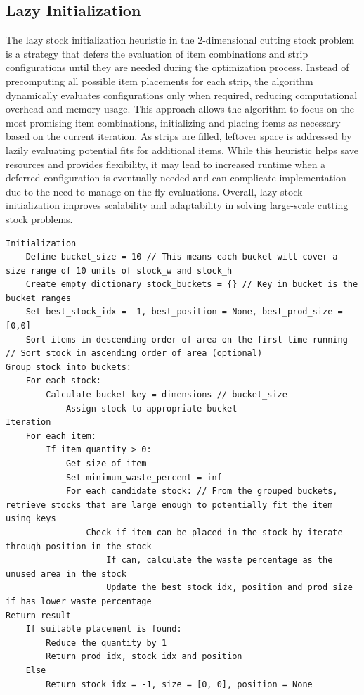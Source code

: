 \documentclass[a4paper]{article}
\begin{document}
\subsection{Lazy Initialization}
The lazy stock initialization heuristic in the 2-dimensional cutting stock problem is a strategy that defers the evaluation of item combinations and strip configurations until they are needed during the optimization process. Instead of precomputing all possible item placements for each strip, the algorithm dynamically evaluates configurations only when required, reducing computational overhead and memory usage. This approach allows the algorithm to focus on the most promising item combinations, initializing and placing items as necessary based on the current iteration. As strips are filled, leftover space is addressed by lazily evaluating potential fits for additional items. While this heuristic helps save resources and provides flexibility, it may lead to increased runtime when a deferred configuration is eventually needed and can complicate implementation due to the need to manage on-the-fly evaluations. Overall, lazy stock initialization improves scalability and adaptability in solving large-scale cutting stock problems.


\begin{verbatim}
Initialization
    Define bucket_size = 10 // This means each bucket will cover a size range of 10 units of stock_w and stock_h
    Create empty dictionary stock_buckets = {} // Key in bucket is the bucket ranges
    Set best_stock_idx = -1, best_position = None, best_prod_size = [0,0]
    Sort items in descending order of area on the first time running // Sort stock in ascending order of area (optional)
Group stock into buckets:
    For each stock:
        Calculate bucket key = dimensions // bucket_size
            Assign stock to appropriate bucket
Iteration
    For each item:
        If item quantity > 0:
            Get size of item
            Set minimum_waste_percent = inf
            For each candidate stock: // From the grouped buckets, retrieve stocks that are large enough to potentially fit the item using keys
                Check if item can be placed in the stock by iterate through position in the stock
                    If can, calculate the waste percentage as the unused area in the stock
                    Update the best_stock_idx, position and prod_size if has lower waste_percentage
Return result
    If suitable placement is found:
        Reduce the quantity by 1
        Return prod_idx, stock_idx and position
    Else
        Return stock_idx = -1, size = [0, 0], position = None
\end{verbatim}
\end{document}
